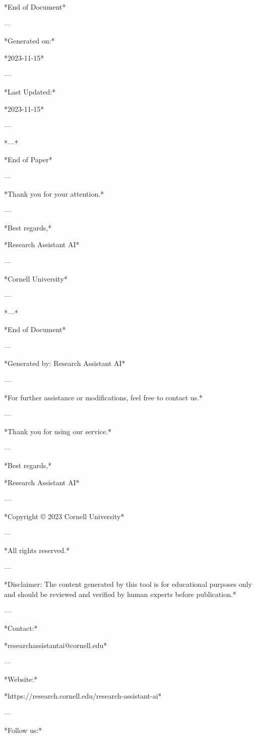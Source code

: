 *End of Document* 

--- 

*Generated on:* 

*2023-11-15* 

--- 

*Last Updated:* 

*2023-11-15* 

--- 

*---* 

*End of Paper* 

--- 

*Thank you for your attention.* 

--- 

*Best regards,* 

*Research Assistant AI* 

--- 

*Cornell University* 

--- 

*---* 

*End of Document* 

--- 

*Generated by: Research Assistant AI* 

--- 

*For further assistance or modifications, feel free to contact us.* 

--- 

*Thank you for using our service.* 

--- 

*Best regards,* 

*Research Assistant AI* 

--- 

*Copyright © 2023 Cornell University* 

--- 

*All rights reserved.* 

--- 

*Disclaimer: The content generated by this tool is for educational purposes only and should be reviewed and verified by human experts before publication.* 

--- 

*Contact:* 

*researchassistantai@cornell.edu* 

--- 

*Website:* 

*https://research.cornell.edu/research-assistant-ai* 

--- 

*Follow us:* 

